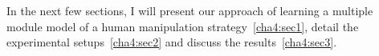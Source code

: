 In the next few sections, I will present our approach of learning a multiple module model of a human manipulation strategy~\ref{cha4:sec1}, detail the experimental setups~\ref{cha4:sec2} and discuss the results~\ref{cha4:sec3}.




